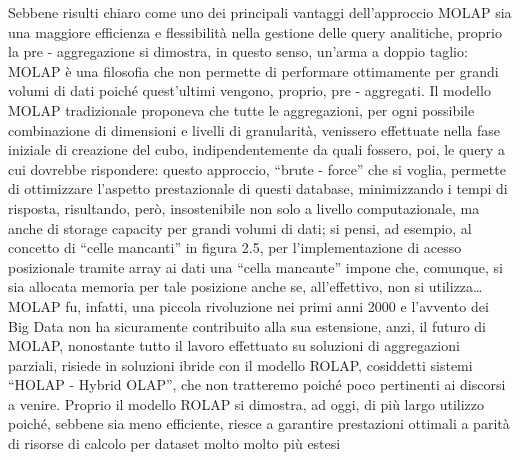 \documentclass[a4paper,12pt]{report}
\begin{document}
Sebbene risulti chiaro come uno dei principali vantaggi dell’approccio MOLAP sia una maggiore efficienza e flessibilità nella gestione delle query analitiche, proprio la pre - aggregazione si dimostra, in questo senso, un’arma a doppio taglio: MOLAP è una filosofia che non permette di performare ottimamente per grandi volumi di dati poiché quest’ultimi vengono, proprio, pre - aggregati. Il modello MOLAP tradizionale proponeva che tutte le aggregazioni, per ogni possibile combinazione di dimensioni e livelli di granularità, venissero effettuate nella fase iniziale di creazione del cubo, indipendentemente da quali fossero, poi, le query a cui dovrebbe rispondere: questo approccio, “brute - force” che si voglia, permette di ottimizzare l’aspetto prestazionale di questi database, minimizzando i tempi di risposta, risultando, però, insostenibile non solo a livello computazionale, ma anche di storage capacity per grandi volumi di dati; si pensi, ad esempio, al concetto di “celle mancanti” in figura 2.5, per l’implementazione di acesso posizionale tramite array ai dati una “cella mancante” impone che, comunque, si sia allocata memoria per tale posizione anche se, all’effettivo, non si utilizza…
MOLAP fu, infatti, una piccola rivoluzione nei primi anni 2000 e l’avvento dei Big Data non ha sicuramente contribuito alla sua estensione, anzi, il futuro di MOLAP, nonostante tutto il lavoro effettuato su soluzioni di aggregazioni parziali, risiede in soluzioni ibride con il modello ROLAP, cosiddetti sistemi “HOLAP - Hybrid OLAP”, che non tratteremo poiché poco pertinenti ai discorsi a venire. Proprio il modello ROLAP si dimostra, ad oggi, di più largo utilizzo poiché, sebbene sia meno efficiente, riesce a garantire prestazioni ottimali a parità di risorse di calcolo per dataset molto molto più estesi
\newpage
\end{document}
